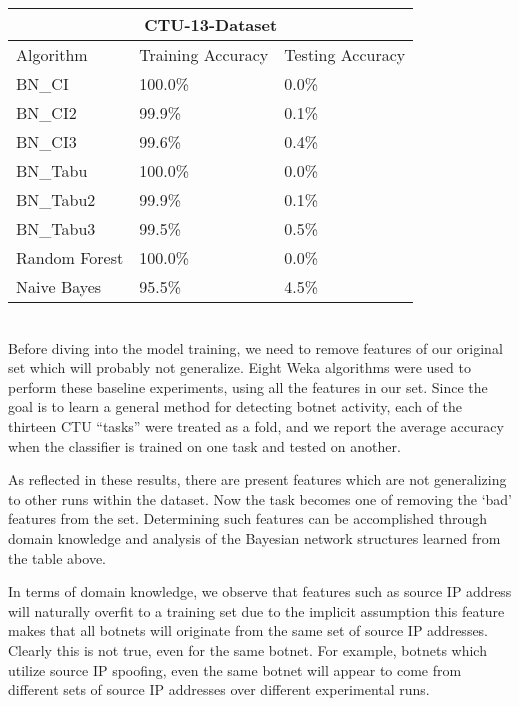 \documentclass[letterpaper]{article}
\begin{document}
\begin{tabular}{ |p{2.3cm}|p{1.9cm}|p{1.9cm}|  }
\hline
\multicolumn{3}{|c|}{CTU-13-Dataset} \\
\hline
Algorithm & Training Accuracy & Testing Accuracy \\
\hline
BN\_CI & 100.0\% & 0.0\% \\
BN\_CI2 & 99.9\% & 0.1\% \\
BN\_CI3 & 99.6\% & 0.4\% \\
BN\_Tabu & 100.0\% & 0.0\% \\
BN\_Tabu2 & 99.9\% & 0.1\% \\
BN\_Tabu3 & 99.5\% & 0.5\% \\
Random Forest & 100.0\% & 0.0\% \\
Naive Bayes & 95.5\% & 4.5\% \\
\hline
\end{tabular}\\

Before diving into the model training, we need to remove features of our original set which will probably not generalize.  Eight Weka \cite{witten2016data} algorithms were used to perform these baseline experiments, using all the features in our set. Since the goal is to learn a general method for detecting botnet activity, each of the thirteen CTU ``tasks'' were treated as a fold, and we report the average accuracy when the classifier is trained on one task and tested on another.

As reflected in these results, there are present features which are not generalizing to other runs within the dataset.  Now the task becomes one of removing the `bad' features from the set.  Determining such features can be accomplished through domain knowledge and analysis of the Bayesian network structures learned from the table above.

In terms of domain knowledge, we observe that features such as source IP address will naturally overfit to a training set due to the implicit assumption this feature makes that all botnets will originate from the same set of source IP addresses.  Clearly this is not true, even for the same botnet.  For example, botnets which utilize source IP spoofing, even the same botnet will appear to come from different sets of source IP addresses over different experimental runs.
\end{document}
